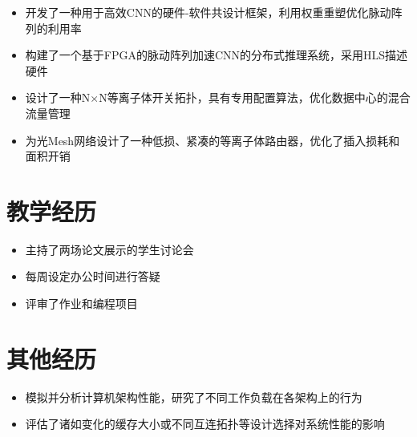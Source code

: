 \documentclass{resume}
\begin{document}
\vspace{-8pt}
\begin{itemize}
  \item 开发了一种用于高效CNN的硬件-软件共设计框架，利用权重重塑优化脉动阵列的利用率
  \item 构建了一个基于FPGA的脉动阵列加速CNN的分布式推理系统，采用HLS描述硬件
  \item 设计了一种N$\times$N等离子体开关拓扑，具有专用配置算法，优化数据中心的混合流量管理
  \item 为光Mesh网络设计了一种低损、紧凑的等离子体路由器，优化了插入损耗和面积开销
\end{itemize}

\section{教学经历}
\vspace{-8pt}
\begin{itemize}
  \item 主持了两场论文展示的学生讨论会
  \item 每周设定办公时间进行答疑
  \item 评审了作业和编程项目
\end{itemize}


\section{其他经历}
\vspace{-8pt}
\begin{itemize}
  \item 模拟并分析计算机架构性能，研究了不同工作负载在各架构上的行为
  \item 评估了诸如变化的缓存大小或不同互连拓扑等设计选择对系统性能的影响
\end{itemize}
\end{document}
